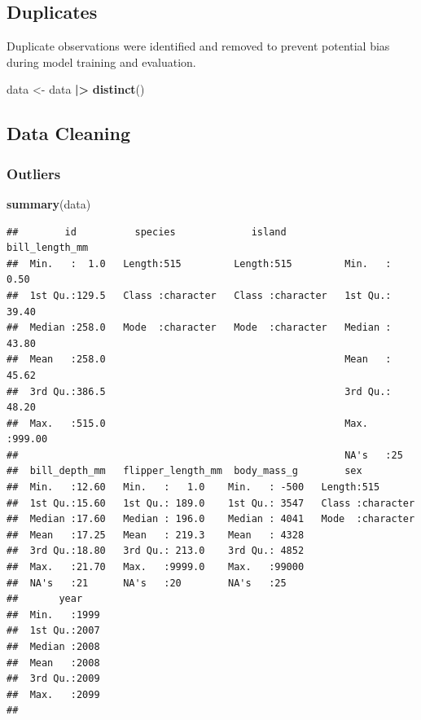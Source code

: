 \documentclass[
]{article}
\newenvironment{Shaded}{\begin{snugshade}}{\end{snugshade}}
\newcommand{\FunctionTok}[1]{\textcolor[rgb]{0.13,0.29,0.53}{\textbf{#1}}}
\newcommand{\NormalTok}[1]{#1}
\newcommand{\OtherTok}[1]{\textcolor[rgb]{0.56,0.35,0.01}{#1}}
\newcommand{\SpecialCharTok}[1]{\textcolor[rgb]{0.81,0.36,0.00}{\textbf{#1}}}
\begin{document}
\subsection{Duplicates}\label{duplicates-1}

Duplicate observations were identified and removed to prevent potential
bias during model training and evaluation.

\begin{Shaded}
\begin{Highlighting}[]
\NormalTok{data }\OtherTok{\textless{}{-}}\NormalTok{ data }\SpecialCharTok{|\textgreater{}}
  \FunctionTok{distinct}\NormalTok{()}
\end{Highlighting}
\end{Shaded}

\subsection{Data Cleaning}\label{data-cleaning}

\subsubsection{Outliers}\label{outliers-2}

\begin{Shaded}
\begin{Highlighting}[]
\FunctionTok{summary}\NormalTok{(data)}
\end{Highlighting}
\end{Shaded}

\begin{verbatim}
##        id          species             island          bill_length_mm  
##  Min.   :  1.0   Length:515         Length:515         Min.   :  0.50  
##  1st Qu.:129.5   Class :character   Class :character   1st Qu.: 39.40  
##  Median :258.0   Mode  :character   Mode  :character   Median : 43.80  
##  Mean   :258.0                                         Mean   : 45.62  
##  3rd Qu.:386.5                                         3rd Qu.: 48.20  
##  Max.   :515.0                                         Max.   :999.00  
##                                                        NA's   :25      
##  bill_depth_mm   flipper_length_mm  body_mass_g        sex           
##  Min.   :12.60   Min.   :   1.0    Min.   : -500   Length:515        
##  1st Qu.:15.60   1st Qu.: 189.0    1st Qu.: 3547   Class :character  
##  Median :17.60   Median : 196.0    Median : 4041   Mode  :character  
##  Mean   :17.25   Mean   : 219.3    Mean   : 4328                     
##  3rd Qu.:18.80   3rd Qu.: 213.0    3rd Qu.: 4852                     
##  Max.   :21.70   Max.   :9999.0    Max.   :99000                     
##  NA's   :21      NA's   :20        NA's   :25                        
##       year     
##  Min.   :1999  
##  1st Qu.:2007  
##  Median :2008  
##  Mean   :2008  
##  3rd Qu.:2009  
##  Max.   :2099  
## 
\end{verbatim}
\end{document}
